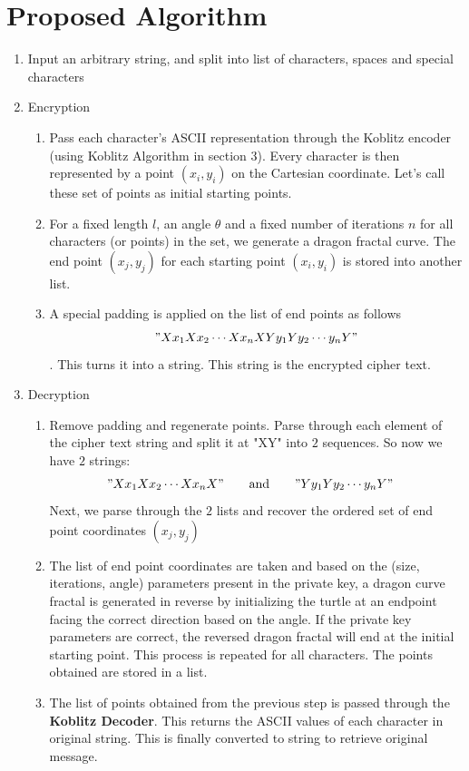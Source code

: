 \documentclass[a4paper,12pt]{article}
\begin{document}
\section{Proposed Algorithm}
    \begin{enumerate}
        \item Input an arbitrary string, and split into list of characters, spaces and special characters
        \item Encryption
        \begin{enumerate}
            \item Pass each character's ASCII representation through the Koblitz encoder (using Koblitz Algorithm in section 3). Every character is then represented by a point $(x_i,y_i)$ on the Cartesian coordinate. Let's call these set of points as initial starting points.
            \item For a fixed length $l$, an angle $\theta$ and a fixed number of iterations $n$ for all characters (or points) in the set, we generate a dragon fractal curve. The end point $(x_j,y_j)$ for each starting point $(x_i,y_i)$ is stored into another list.
            \item A special padding is applied on the list of end points as follows $$"Xx_1Xx_2\cdots Xx_nXYy_1Yy_2\cdots y_nY"$$. This turns it into a string. This string is the encrypted cipher text.
        \end{enumerate}
        
        \item Decryption
        \begin{enumerate}
            \item Remove padding and regenerate points. Parse through each element of the cipher text string and split it at "XY" into $2$ sequences. So now we have $2$ strings:
                \begin{align*}
                    "Xx_1Xx_2\cdots Xx_nX"&\qquad\text{and}\qquad"Yy_1Yy_2\cdots y_nY"
                \end{align*}
            Next, we parse through the $2$ lists and recover the ordered set of end point coordinates $(x_j,y_j)$
            \item The list of end point coordinates are taken and based on the (size, iterations, angle) parameters present in the private key, a dragon curve fractal is generated in reverse by initializing the turtle at an endpoint facing the correct direction based on the angle. If the private key parameters are correct, the reversed dragon fractal will end at the initial starting point. This process is repeated for all characters. The points obtained are stored in a list.
            \item The list of points obtained from the previous step is passed through the \textbf{Koblitz Decoder}. This returns the ASCII values of each character in original string. This is finally converted to string to retrieve original message.
        \end{enumerate}
    \end{enumerate}
\end{document}
